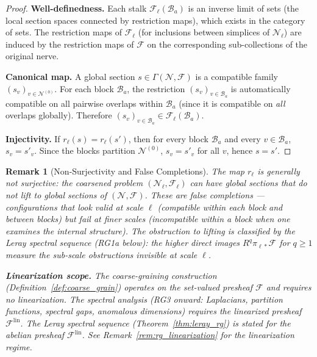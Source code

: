 \documentclass[11pt,letterpaper]{article}
\newtheorem{remark}[conjecture]{Remark}
\newcommand{\sheaf}{\mathcal{F}}
\newcommand{\nerve}{\mathcal{N}}
\newcommand{\block}{\mathcal{B}}
\begin{document}
\begin{proof}
\textbf{Well-definedness.} Each stalk $\sheaf_\ell(\block_a)$ is 
an inverse limit of sets (the local section spaces connected by 
restriction maps), which exists in the category of sets. The 
restriction maps of $\sheaf_\ell$ (for inclusions between simplices 
of $\nerve_\ell$) are induced by the restriction maps of $\sheaf$ 
on the corresponding sub-collections of the original nerve.

\textbf{Canonical map.} A global section $s \in \Gamma(\nerve, 
\sheaf)$ is a compatible family $(s_v)_{v \in \nerve^{(0)}}$. For 
each block $\block_a$, the restriction $(s_v)_{v \in \block_a}$ is 
automatically compatible on all pairwise overlaps within $\block_a$ 
(since it is compatible on \emph{all} overlaps globally). Therefore 
$(s_v)_{v \in \block_a} \in \sheaf_\ell(\block_a)$.

\textbf{Injectivity.} If $r_\ell(s) = r_\ell(s')$, then for every 
block $\block_a$ and every $v \in \block_a$, $s_v = s'_v$. Since 
the blocks partition $\nerve^{(0)}$, $s_v = s'_v$ for all $v$, 
hence $s = s'$.
\end{proof}

\begin{remark}[Non-Surjectivity and False Completions]
\label{rem:false_completions}
The map $r_\ell$ is generally \emph{not} surjective: the coarsened 
problem $(\nerve_\ell, \sheaf_\ell)$ can have global sections that 
do not lift to global sections of $(\nerve, \sheaf)$. These are 
\emph{false completions} --- configurations that look valid at scale 
$\ell$ (compatible within each block and between blocks) but fail at 
finer scales (incompatible within a block when one examines the 
internal structure). The obstruction to lifting is classified by the 
Leray spectral sequence (RG1a below): the higher direct images 
$R^q \pi_{\ell *} \sheaf$ for $q \geq 1$ measure the sub-scale 
obstructions invisible at scale $\ell$.

\textbf{Linearization scope.} The coarse-graining construction 
(Definition~\ref{def:coarse_grain}) operates on the set-valued 
presheaf $\sheaf$ and requires no linearization. The spectral 
analysis (RG3 onward: Laplacians, partition functions, spectral 
gaps, anomalous dimensions) requires the linearized presheaf 
$\sheaf^{\mathrm{lin}}$. The Leray spectral sequence 
(Theorem~\ref{thm:leray_rg}) is stated for the abelian presheaf 
$\sheaf^{\mathrm{lin}}$. See Remark~\ref{rem:rg_linearization} 
for the linearization regime.
\end{remark}
\end{document}
